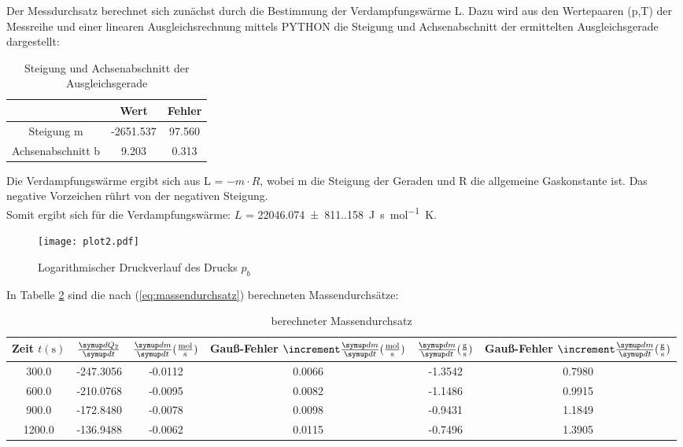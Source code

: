 {{Der Messdurchsatz berechnet sich zunächst durch die Bestimmung der Verdampfungswärme L.
Dazu wird aus den Wertepaaren (p,T) der Messreihe und einer linearen Ausgleichsrechnung mittels PYTHON die 
Steigung und Achsenabschnitt der ermittelten Ausgleichsgerade dargestellt: 

\begin{table}
  \centering
  \caption{Steigung und Achsenabschnitt der Ausgleichsgerade}
  \label{tab:güteziffern_t1}
  \begin{tabular}{c c c}
    \toprule
    {} &         Wert &      Fehler \\
    \midrule
    Steigung m        & -2651.537 &  97.560 \\
    Achsenabschnitt b &     9.203 &   0.313 \\
    \bottomrule
  \end{tabular}
\end{table} 

Die Verdampfungswärme ergibt sich aus L = $-m \cdot R$, wobei m die Steigung der Geraden und R die 
allgemeine Gaskonstante ist. Das negative Vorzeichen rührt von der negativen Steigung. 
\\

Somit ergibt sich für die Verdampfungswärme:
$L$ = \qty{22046.074(811.158)}{\unit[per-mode=fraction]{\joule\second\per\mol\kelvin}}.

\begin{figure}
  \centering
  \texttt{[image: plot2.pdf]}
  \caption{Logarithmischer Druckverlauf des Drucks $p_{b}$}
  \label{fig:plot2}
\end{figure}

In Tabelle \ref{tb:massendurchsaetze} sind die nach (\ref{eq:massendurchsatz}) berechneten Massendurchsätze:

\begin{table} 
  \centering
  \caption{berechneter Massendurchsatz}
  \label{tb:massendurchsaetze}
  \begin{tabular}{c c c c c c}
    \toprule
    {Zeit $t (\unit{\second})$} &
    {$\frac {\dif{Q_{2}}} {\dif{t}}$} &
    {$\frac {\dif{m}} {\dif{t}} (\unit[per-mode=fraction]{\mol\per\second})$} &
    {Gauß-Fehler $\increment \frac {\dif{m}} {\dif{t}} (\unit[per-mode=fraction]{\mol\per\second})$} &
    {$\frac{\dif{m}} {\dif{t}} (\unit[per-mode=fraction]{\gram\per\second})$} &
    {Gauß-Fehler $\increment \frac {\dif{m}} {\dif{t}} (\unit[per-mode=fraction]{\gram\per\second})$} \\
    \midrule
     300.0 & -247.3056 &        -0.0112 &          0.0066 &      -1.3542 &        0.7980 \\
     600.0 & -210.0768 &        -0.0095 &          0.0082 &      -1.1486 &        0.9915 \\
     900.0 & -172.8480 &        -0.0078 &          0.0098 &      -0.9431 &        1.1849 \\
    1200.0 & -136.9488 &        -0.0062 &          0.0115 &      -0.7496 &        1.3905 \\
    \bottomrule
\end{tabular}
\end{table}

}}
